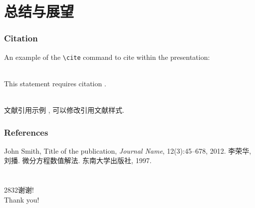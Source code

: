 \documentclass[noamsthm,notheorems,11pt,compress]{beamer}
\makeatletter
\numberwithin{figure}{section}
\numberwithin{table}{section}
\numberwithin{equation}{section}
\theoremstyle{plain} %
\newcounter{example}[section]
\newcommand\HUGE{\@setfontsize\Huge{28}{32}}
\makeatother
\begin{document}
\section{总结与展望}

\begin{frame}[fragile] %
\frametitle{Citation}
An example of the \verb|\cite| command to cite within the presentation:\\~

This statement requires citation \cite{Smith2012}. \\~

文献引用示例 \cite{LiLiu1997}, 可以修改引用文献样式.
\end{frame}


\begin{frame}
\frametitle{References}
\footnotesize{
\begin{thebibliography}{99} %
 John Smith, Title of the publication, \emph{Journal Name}, 12(3):45--678, 2012.
 李荣华, 刘播. 微分方程数值解法. 东南大学出版社, 1997.
\end{thebibliography}
}
\end{frame}


\section{}


\begin{frame}
\begin{center}
\HUGE \textcolor[RGB]{165,3,3}{谢\quad 谢! \\[8pt]
Thank you!}
\end{center}
\end{frame}
\end{document}
